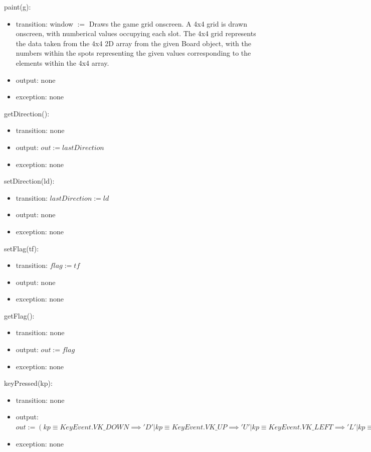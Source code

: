 \documentclass[12pt]{article}
\begin{document}
\noindent paint(g):
\begin{itemize}
\item transition: window $:=$ Draws the game grid onscreen. A 4x4 grid is drawn onscreen, with numberical values occupying each slot. The 4x4 grid represents the data taken from the 4x4 2D array from the given Board object, with the numbers within the spots representing the given values corresponding to the elements within the 4x4 array. 
\item output: none
\item exception: none
\end{itemize}

\noindent getDirection():
\begin{itemize}
\item transition: none
\item output: $out := lastDirection$
\item exception: none
\end{itemize}

\noindent setDirection(ld):
\begin{itemize}
\item transition: $lastDirection := ld$
\item output: none
\item exception: none
\end{itemize}

\noindent setFlag(tf):
\begin{itemize}
\item transition: $flag := tf$
\item output: none
\item exception: none
\end{itemize}

\noindent getFlag():
\begin{itemize}
\item transition: none
\item output: $out := flag$
\item exception: none
\end{itemize}

\noindent keyPressed(kp):
\begin{itemize}
\item transition: none
\item output: $out := (kp \equiv KeyEvent.VK\_DOWN \implies 'D' |kp \equiv KeyEvent.VK\_UP \implies 'U' | kp \equiv KeyEvent.VK\_LEFT \implies 'L' |kp \equiv KeyEvent.VK\_RIGHT \implies 'R'| kp \equiv KeyEvent.VK\_ESCAPE \implies 'E'| True \implies void)$
\item exception: none
\end{itemize}
\end{document}
